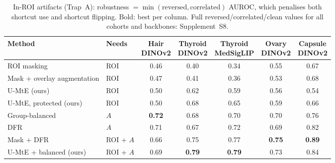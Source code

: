 \begin{table}[t]\centering\small
\caption{In-ROI artifacts (Trap~A): robustness $=\min(\text{reversed},\text{correlated})$ AUROC, which penalises both shortcut use and shortcut flipping. Bold: best per column. Full reversed/correlated/clean values for all cohorts and backbones: Supplement~S8.}
\label{m:tab:remedies}
\begin{tabular}{llccccc}
\toprule
Method & Needs & \shortstack{Hair\\ \scriptsize DINOv2} & \shortstack{Thyroid\\ \scriptsize DINOv2} & \shortstack{Thyroid\\ \scriptsize MedSigLIP} & \shortstack{Ovary\\ \scriptsize DINOv2} & \shortstack{Capsule\\ \scriptsize DINOv2} \\
\midrule
ROI masking & ROI & 0.46 & 0.40 & 0.34 & 0.55 & 0.67 \\
Mask + overlay augmentation & ROI & 0.47 & 0.41 & 0.36 & 0.53 & 0.68 \\
U-MtE (ours) & ROI & 0.50 & 0.62 & 0.59 & 0.56 & 0.54 \\
U-MtE, protected (ours) & ROI & 0.50 & 0.68 & 0.65 & 0.59 & 0.66 \\
Group-balanced & $A$ & \textbf{0.72} & 0.68 & 0.70 & 0.70 & 0.76 \\
DFR & $A$ & 0.71 & 0.67 & 0.72 & 0.69 & 0.82 \\
Mask + DFR & ROI + $A$ & 0.66 & 0.75 & 0.77 & \textbf{0.75} & \textbf{0.89} \\
U-MtE + balanced (ours) & ROI + $A$ & 0.69 & \textbf{0.79} & \textbf{0.79} & 0.73 & 0.84 \\
\bottomrule
\end{tabular}
\end{table}
